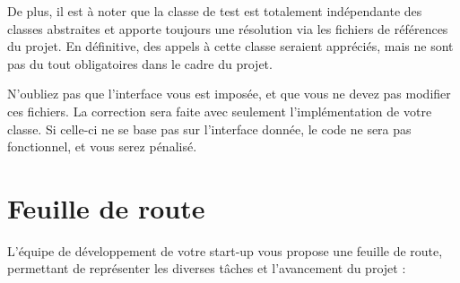 \documentclass[9pts]{article}
\begin{document}
De plus, il est à noter que la classe de test est totalement indépendante des classes abstraites et apporte toujours une résolution via les fichiers de références du projet. En définitive, des appels à cette classe seraient appréciés, mais ne sont pas du tout obligatoires dans le cadre du projet.

N'oubliez pas que l'interface vous est imposée, et que vous ne devez pas modifier ces fichiers. La correction sera faite avec seulement l'implémentation de votre classe. Si celle-ci ne se base pas sur l'interface donnée, le code ne sera pas fonctionnel, et vous serez pénalisé.

\pagebreak

\section{Feuille de route}
\label{sec::feuille}
L'équipe de développement de votre start-up vous propose une feuille de route, permettant de représenter les diverses tâches et l'avancement du projet :
\end{document}

